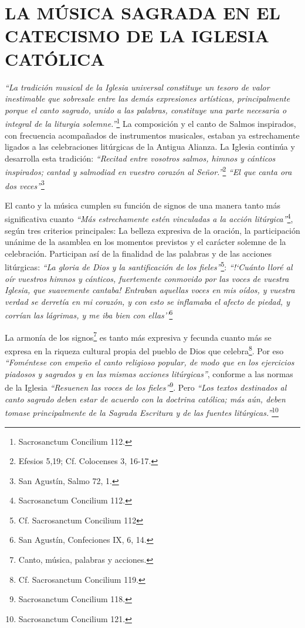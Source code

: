 \documentclass[letterpaper, 12pt]{book}
\begin{document}
    \chapter{LA M\'USICA SAGRADA EN EL CATECISMO DE LA IGLESIA CAT\'OLICA}
    \textit{``La tradici\'on musical de la Iglesia universal constituye un tesoro de valor inestimable que sobresale entre las dem\'as expresiones art\'isticas, principalmente porque el canto sagrado, unido a las palabras, constituye una parte necesaria o integral de la liturgia solemne.''}\footnote{Sacrosanctum Concilium 112.} La composici\'on y el canto de Salmos inspirados, con frecuencia acompa\~nados de instrumentos musicales, estaban ya estrechamente ligados a las celebraciones lit\'urgicas de la Antigua Alianza. La Iglesia contin\'ua y desarrolla esta tradici\'on: \textit{``Recitad entre vosotros salmos, himnos y c\'anticos inspirados; cantad y salmodiad en vuestro corazón al Se\~nor.''}\footnote{Efesios 5,19; Cf. Colocenses 3, 16-17.} \textit{``El que canta ora dos veces''}\footnote{San Agustín, Salmo 72, 1.}\newline
    
    El canto y la m\'usica cumplen su funci\'on de signos de una manera tanto m\'as significativa cuanto \textit{``M\'as estrechamente est\'en vinculadas a la acci\'on lit\'urgica''}\footnote{Sacrosanctum Concilium 112.}, seg\'un tres criterios principales: La belleza expresiva de la oraci\'on, la participaci\'on un\'anime de la asamblea en los momentos previstos y el car\'acter solemne de la celebraci\'on. Participan as\'i de la finalidad de las palabras y de las acciones lit\'urgicas: \textit{``La gloria de Dios y la santificaci\'on de los fieles''}\footnote{Cf. Sacrosanctum Concilium 112}: \textit{``!`Cu\'anto llor\'e al o\'ir vuestros himnos y c\'anticos, fuertemente conmovido por las voces de vuestra Iglesia, que suavemente cantaba! Entraban aquellas voces en mis o\'idos, y vuestra verdad se derret\'ia en mi coraz\'on, y con esto se inflamaba el afecto de piedad, y corr\'ian las l\'agrimas, y me iba bien con ellas''}\footnote{San Agust\'in, Confeciones IX, 6, 14.}\newline

    La armon\'ia de los signos\footnote{Canto, m\'usica, palabras y acciones.} es tanto m\'as expresiva y fecunda cuanto m\'as se expresa en la riqueza cultural propia del pueblo de Dios que celebra\footnote{Cf. Sacrosanctum Concilium 119.}. Por eso \textit{``Fom\'entese con empe\~no el canto religioso popular, de modo que en los ejercicios piadosos y sagrados y en las mismas acciones lit\'urgicas''}, conforme a las normas de la Iglesia \textit{``Resuenen las voces de los fieles''}\footnote{Sacrosanctum Concilium 118.}. Pero \textit{``Los textos destinados al canto sagrado deben estar de acuerdo con la doctrina cat\'olica; m\'as a\'un, deben tomase principalmente de la Sagrada Escritura y de las fuentes lit\'urgicas.''}\footnote{Sacrosanctum Concilium 121.}
    
\end{document}
